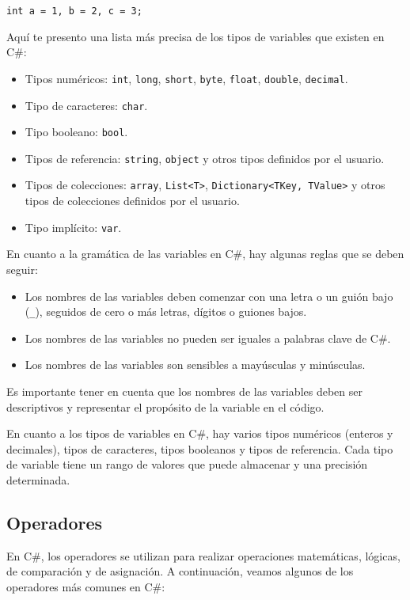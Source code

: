\documentclass[executivepaper]{article}
\begin{document}
\begin{lstlisting}
int a = 1, b = 2, c = 3;
\end{lstlisting}

Aquí te presento una lista más precisa de los tipos de variables que existen en C\#:

\begin{itemize}
\item Tipos numéricos: \verb|int|, \verb|long|, \verb|short|, \verb|byte|, \verb|float|, \verb|double|, \verb|decimal|.
\item Tipo de caracteres: \verb|char|.
\item Tipo booleano: \verb|bool|.
\item Tipos de referencia: \verb|string|, \verb|object| y otros tipos definidos por el usuario.
\item Tipos de colecciones: \verb|array|, \verb|List<T>|, \verb|Dictionary<TKey, TValue>| y otros tipos de colecciones definidos por el usuario.
\item Tipo implícito: \verb|var|.
\end{itemize}

En cuanto a la gramática de las variables en  C\#, hay algunas reglas que se deben seguir:

\begin{itemize}
\item Los nombres de las variables deben comenzar con una letra o un guión bajo (\verb|_|), seguidos de cero o más letras, dígitos o guiones bajos.
\item Los nombres de las variables no pueden ser iguales a palabras clave de  C\#.
\item Los nombres de las variables son sensibles a mayúsculas y minúsculas.
\end{itemize}

Es importante tener en cuenta que los nombres de las variables deben ser descriptivos y representar el propósito de la variable en el código.

En cuanto a los tipos de variables en  C\#, hay varios tipos numéricos (enteros y decimales), tipos de caracteres, tipos booleanos y tipos de referencia. Cada tipo de variable tiene un rango de valores que puede almacenar y una precisión determinada.

\subsection{Operadores}

En C\#, los operadores se utilizan para realizar operaciones matemáticas, lógicas, de comparación y de asignación. A continuación, veamos algunos de los operadores más comunes en C\#:
\end{document}
